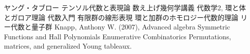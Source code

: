 \begin{thebibliography}{99}
   ヤング・タブロー
   テンソル代数と表現論
   数え上げ幾何学講義
   代数学2, 環と体とガロア理論
   代数入門
   有限群の線形表現
   環と加群のホモロジー代数的理論
  リー代数と量子群
  Knapp, Anthony W. (2007), Advanced algebra
   Symmetric Functions and Hall Polynomials
   Enumerative Combinatorics
   Permutations, matrices, and generalized Young tableaux.
\end{thebibliography}